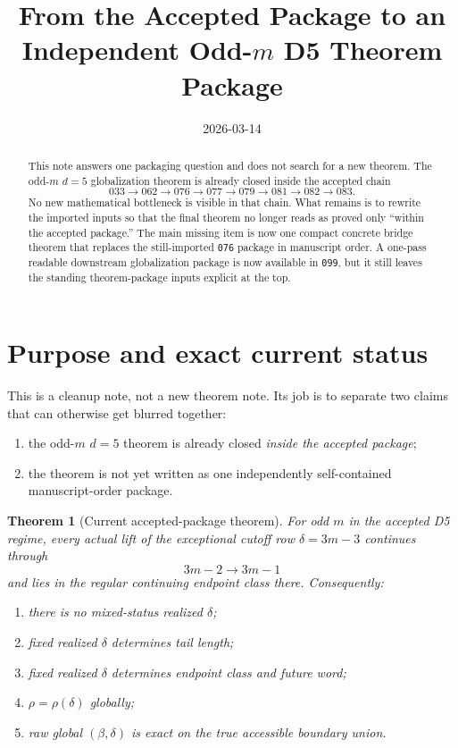 \documentclass[11pt]{article}
\title{From the Accepted Package to an Independent Odd-$m$ D5 Theorem Package}
\author{}
\date{2026-03-14}
\newtheorem{theorem}{Theorem}
\begin{document}
\maketitle

\begin{abstract}
This note answers one packaging question and does not search for a new theorem.
The odd-$m$ $d=5$ globalization theorem is already closed inside the accepted
chain
\[
033 \to 062 \to 076 \to 077 \to 079 \to 081 \to 082 \to 083.
\]
No new mathematical bottleneck is visible in that chain. What remains is to
rewrite the imported inputs so that the final theorem no longer reads as proved
only ``within the accepted package.'' The main missing item is now one compact
concrete bridge theorem that replaces the still-imported \texttt{076} package
in manuscript order. A one-pass readable downstream globalization package is
now available in \texttt{099}, but it still leaves the standing theorem-package
inputs explicit at the top.
\end{abstract}

\section{Purpose and exact current status}

This is a cleanup note, not a new theorem note. Its job is to separate two
claims that can otherwise get blurred together:
\begin{enumerate}[label=\textup{(\arabic*)},leftmargin=2.2em]
\item the odd-$m$ $d=5$ theorem is already closed \emph{inside the accepted
package};
\item the theorem is not yet written as one independently self-contained
manuscript-order package.
\end{enumerate}

\begin{theorem}[Current accepted-package theorem]
For odd $m$ in the accepted D5 regime, every actual lift of the exceptional
cutoff row $\delta=3m-3$ continues through
\[
3m-2 \to 3m-1
\]
and lies in the regular continuing endpoint class there. Consequently:
\begin{enumerate}[label=\textup{(\arabic*)},leftmargin=2.2em]
\item there is no mixed-status realized $\delta$;
\item fixed realized $\delta$ determines tail length;
\item fixed realized $\delta$ determines endpoint class and future word;
\item $\rho=\rho(\delta)$ globally;
\item raw global $(\beta,\delta)$ is exact on the true accessible boundary
union.
\end{enumerate}
\end{theorem}
\end{document}
